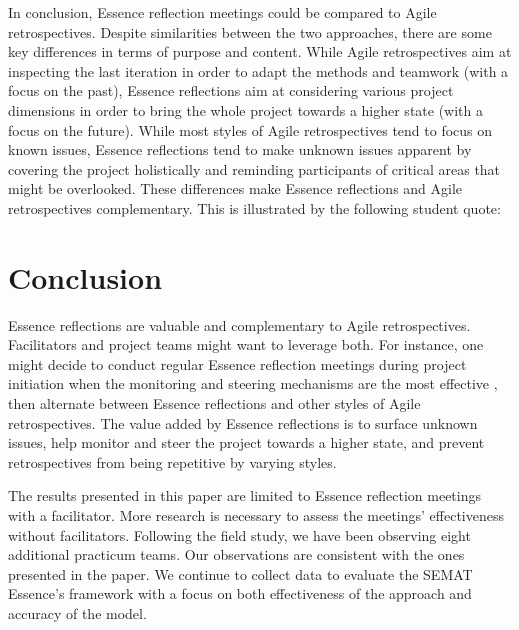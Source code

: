 In conclusion, Essence reflection meetings could be compared to Agile retrospectives. Despite similarities between the two approaches, there are some key differences in terms of purpose and content. While Agile retrospectives aim at inspecting the last iteration in order to adapt the methods and teamwork (with a focus on the past), Essence reflections aim at considering various project dimensions in order to bring the whole project towards a higher state (with a focus on the future). While most styles of Agile retrospectives tend to focus on known issues, Essence reflections tend to make unknown issues apparent by covering the project holistically and reminding participants of critical areas that might be overlooked. These differences make Essence reflections and Agile retrospectives complementary. This is illustrated by the following student quote: 

\section {Conclusion}
Essence reflections are valuable and complementary to Agile retrospectives. Facilitators and project teams might want to leverage both. For instance, one might decide to conduct regular Essence reflection meetings during project initiation when the monitoring and steering mechanisms are the most effective \cite{ICSE2014}, then alternate between Essence reflections and other styles of Agile retrospectives. The value added by Essence reflections is to surface unknown issues, help monitor and steer the project towards a higher state, and prevent retrospectives from being repetitive by varying styles.

The results presented in this paper are limited to Essence reflection meetings with a facilitator. More research is necessary to assess the meetings' effectiveness without facilitators. Following the field study, we have been observing eight additional practicum teams. Our observations are consistent with the ones presented in the paper. We continue to collect data to evaluate the SEMAT Essence's framework with a focus on both effectiveness of the approach and accuracy of the model.

